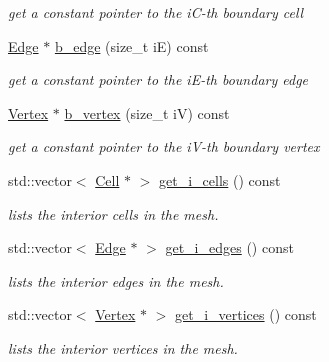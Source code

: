 \begin{DoxyCompactItemize}
\begin{DoxyCompactList}\small\item\em get a constant pointer to the i\+C-\/th boundary cell \end{DoxyCompactList}\item 
\mbox{\label{classHArDCore2D_1_1Mesh_a07395cbe8ecaf85abf52f91aef20422f}} 
\hyperlink{classHArDCore2D_1_1Edge}{Edge} $\ast$ \hyperlink{classHArDCore2D_1_1Mesh_a07395cbe8ecaf85abf52f91aef20422f}{b\+\_\+edge} (size\+\_\+t iE) const
\begin{DoxyCompactList}\small\item\em get a constant pointer to the i\+E-\/th boundary edge \end{DoxyCompactList}\item 
\mbox{\label{classHArDCore2D_1_1Mesh_a749b688ccabc6bfcf630b759607ef29a}} 
\hyperlink{classHArDCore2D_1_1Vertex}{Vertex} $\ast$ \hyperlink{classHArDCore2D_1_1Mesh_a749b688ccabc6bfcf630b759607ef29a}{b\+\_\+vertex} (size\+\_\+t iV) const
\begin{DoxyCompactList}\small\item\em get a constant pointer to the i\+V-\/th boundary vertex \end{DoxyCompactList}\item 
std\+::vector$<$ \hyperlink{classHArDCore2D_1_1Cell}{Cell} $\ast$ $>$ \hyperlink{group__Mesh_gab962f4a1a88c7f4910a5e555e01064f3}{get\+\_\+i\+\_\+cells} () const
\begin{DoxyCompactList}\small\item\em lists the interior cells in the mesh. \end{DoxyCompactList}\item 
std\+::vector$<$ \hyperlink{classHArDCore2D_1_1Edge}{Edge} $\ast$ $>$ \hyperlink{group__Mesh_gabaaffe0b8981c9dab16ae34d63262638}{get\+\_\+i\+\_\+edges} () const
\begin{DoxyCompactList}\small\item\em lists the interior edges in the mesh. \end{DoxyCompactList}\item 
std\+::vector$<$ \hyperlink{classHArDCore2D_1_1Vertex}{Vertex} $\ast$ $>$ \hyperlink{group__Mesh_ga8f9f78dee50bb3c64136af58ee3468b4}{get\+\_\+i\+\_\+vertices} () const
\begin{DoxyCompactList}\small\item\em lists the interior vertices in the mesh. \end{DoxyCompactList}\item 

\end{DoxyCompactItemize}
